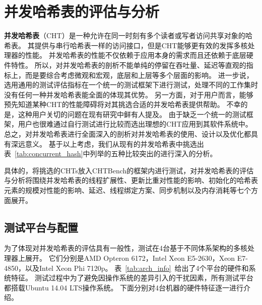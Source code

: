 \section{并发哈希表的评估与分析}
\textbf{并发哈希表}（CHT）是一种允许在同一时刻有多个读者或写者访问共享对象的哈希表。
其提供与串行哈希表一样的访问接口，但是CHT能够更有效的发挥多核处理器的性能。
并发哈希表的性能不仅依赖于应用本身的需求而且还依赖于底层硬件特性。
所以，对并发哈希表的剖析不能单纯的停留在吞吐量、延迟等直观的指标上，而是要综合考虑微观和宏观，底层和上层等多个层面的影响。
进一步说，选用通用的测试评估指标在一个统一的测试框架下进行测试，处理不同的工作集时没有任何一种并发哈希表能全面的体现其优势。
另一方面，对于用户而言，能够预先知道某种CHT的性能障碍将对其挑选合适的并发哈希表提供帮助。
不幸的是，这种用户关切的问题在现有研究中鲜有人提及。
由于缺乏一个统一的测试框架，用户也很难通过自行测试进行比较而选出理想的CHT应用到其软件系统中。
总之，对并发哈希表进行全面深入的剖析对并发哈希表的使用、设计以及优化都具有深远意义。
基于以上考虑，我们从现有的并发哈希表中挑选出表~\ref{tab:concurrent_hash}中列举的五种比较突出的进行深入的分析。

具体的，将挑选的CHTs放入CHTBench的框架内进行测试，对并发哈希表的评估与分析将围绕并发哈希表的线程扩展性、更新比重对性能的影响、初始化的哈希表元素的规模对性能的影响、延迟、线程绑定方案、同步机制以及内存消耗等七个方面展开。

\subsection{测试平台与配置}
为了体现对并发哈希表的评估具有一般性，测试在4台基于不同体系架构的多核处理器上展开。
它们分别是AMD Opteron 6172，Intel Xeon E5-2630，Xeon E7-4850，以及Intel Xeon Phi 7120p。
表~\ref{tab:arch_info}~给出了4个平台的硬件和系统特征。
测试过程中为了避免因操作系统的差异引入的干扰因素，所有测试平台都搭载Ubuntu 14.04 LTS操作系统。
下面分别对4台机器的硬件特征逐一进行介绍。

